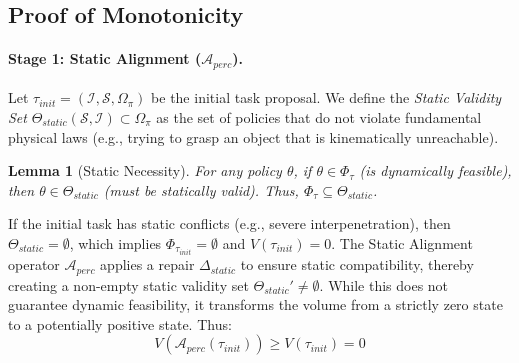 \documentclass{article}
\theoremstyle{plain}
\newtheorem{lemma}[theorem]{Lemma}
\theoremstyle{definition}
\theoremstyle{remark}
\begin{document}
\subsection{Proof of Monotonicity}

\paragraph{Stage 1: Static Alignment ($\mathcal{A}_{perc}$).}
Let $\tau_{init} = (\mathcal{I}, \mathcal{S}, \Omega_\pi)$ be the initial task proposal.
We define the \textit{Static Validity Set} $\Theta_{static}(\mathcal{S}, \mathcal{I}) \subset \Omega_\pi$ as the set of policies that do not violate fundamental physical laws (e.g., trying to grasp an object that is kinematically unreachable).
\begin{lemma}[Static Necessity]
    For any policy $\theta$, if $\theta \in \Phi_\tau$ (is dynamically feasible), then $\theta \in \Theta_{static}$ (must be statically valid). Thus, $\Phi_\tau \subseteq \Theta_{static}$.
\end{lemma}
If the initial task has static conflicts (e.g., severe interpenetration), then $\Theta_{static} = \emptyset$, which implies $\Phi_{\tau_{init}} = \emptyset$ and $V(\tau_{init}) = 0$.
The Static Alignment operator $\mathcal{A}_{perc}$ applies a repair $\Delta_{static}$ to ensure static compatibility, thereby creating a non-empty static validity set $\Theta_{static}' \neq \emptyset$.
While this does not guarantee dynamic feasibility, it transforms the volume from a strictly zero state to a potentially positive state. Thus:
\begin{equation}
    V(\mathcal{A}_{perc}(\tau_{init})) \ge V(\tau_{init}) = 0
\end{equation}
\end{document}

